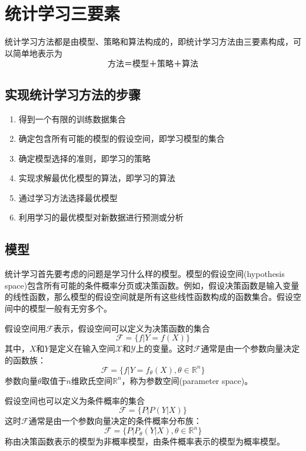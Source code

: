 \section{统计学习三要素}
统计学习方法都是由模型、策略和算法构成的，即统计学习方法由三要素构成，可以简单地表示为
\begin{equation*}
\text{方法＝模型＋策略＋算法}
\end{equation*}
\subsection*{实现统计学习方法的步骤}
\begin{enumerate}[(1)]
	\item 得到一个有限的训练数据集合
	\item 确定包含所有可能的模型的假设空间，即学习模型的集合
	\item 确定模型选择的准则，即学习的策略
	\item 实现求解最优化模型的算法，即学习的算法 
	\item 通过学习方法选择最优模型
	\item 利用学习的最优模型对新数据进行预测或分析
\end{enumerate}

\subsection*{模型}
统计学习首先要考虑的问题是学习什么样的模型。模型的假设空间(hypothesis space)包含所有可能的条件概率分页或决策函数。例如，假设决策函数是输入变量的线性函数，那么模型的假设空间就是所有这些线性函数构成的函数集合。假设空间中的模型一般有无穷多个。

假设空间用$\mathcal{F}$表示，假设空间可以定义为决策函数的集合
\begin{equation}
	\mathcal{F}=\{f|Y=f(X)\}
\end{equation}
其中，$X$和$Y$是定义在输入空间$\mathcal{X}$和$\mathcal{Y}$上的变量。这时$\mathcal{F}$通常是由一个参数向量决定的函数族：
\begin{equation}
	\mathcal{F}=\{f|Y=f_\theta(X),\theta\in \mathbb{R}^n\}
\end{equation}
参数向量$\theta$取值于$n$维欧氏空间$\mathbb{R}^n$，称为参数空间(parameter space)。

假设空间也可以定义为条件概率的集合
\begin{equation}
	\mathcal{F}=\{P|P(Y|X)\}
\end{equation}
这时$\mathcal{F}$通常是由一个参数向量决定的条件概率分布族：
\begin{equation}
\mathcal{F}=\{P|P_\theta(Y|X),\theta\in \mathbb{R}^n\}
\end{equation}
称由决策函数表示的模型为非概率模型，由条件概率表示的模型为概率模型。
